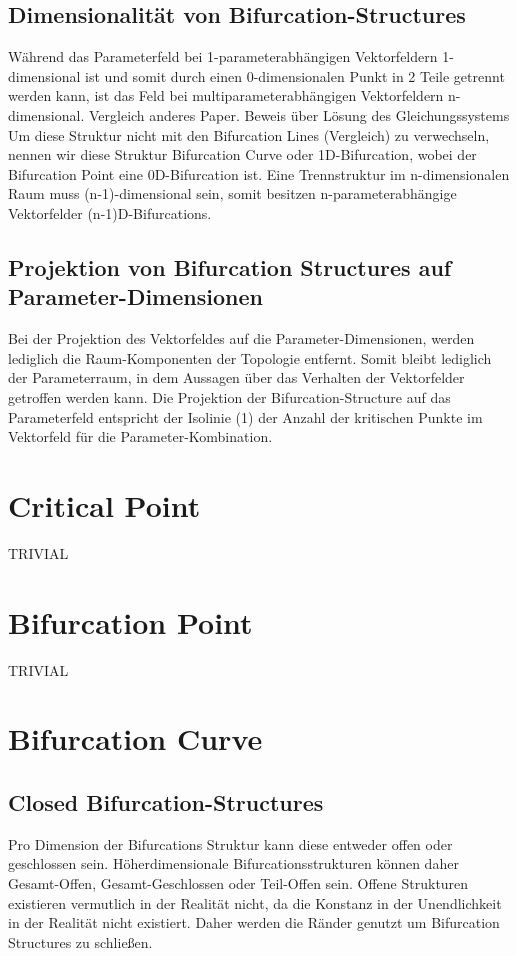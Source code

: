 \documentclass[11pt]{article}
\begin{document}
\subsection{Dimensionalität von Bifurcation-Structures}
Während das Parameterfeld bei 1-parameterabhängigen Vektorfeldern 1-dimensional ist und somit durch einen 0-dimensionalen Punkt in 2 Teile getrennt werden kann, ist das Feld bei multiparameterabhängigen Vektorfeldern n-dimensional.
Vergleich anderes Paper.
Beweis über Lösung des Gleichungssystems
Um diese Struktur nicht mit den Bifurcation Lines (Vergleich) zu verwechseln, nennen wir diese Struktur Bifurcation Curve oder 1D-Bifurcation, wobei der Bifurcation Point eine 0D-Bifurcation ist.
Eine Trennstruktur im n-dimensionalen Raum muss (n-1)-dimensional sein, somit besitzen n-parameterabhängige Vektorfelder (n-1)D-Bifurcations.

\subsection{Projektion von Bifurcation Structures auf Parameter-Dimensionen}
Bei der Projektion des Vektorfeldes auf die Parameter-Dimensionen, werden lediglich die Raum-Komponenten der Topologie entfernt. Somit bleibt lediglich der Parameterraum, in dem Aussagen über das Verhalten der Vektorfelder getroffen werden kann.
Die Projektion der Bifurcation-Structure auf das Parameterfeld entspricht der Isolinie (1) der Anzahl der kritischen Punkte im Vektorfeld für die Parameter-Kombination.
\section{Critical Point}
TRIVIAL
\section{Bifurcation Point}
TRIVIAL
\section{Bifurcation Curve}
\subsection{Closed Bifurcation-Structures}
Pro Dimension der Bifurcations Struktur kann diese entweder offen oder geschlossen sein.
Höherdimensionale Bifurcationsstrukturen können daher Gesamt-Offen, Gesamt-Geschlossen oder Teil-Offen sein.
Offene Strukturen existieren vermutlich in der Realität nicht, da die Konstanz in der Unendlichkeit in der Realität nicht existiert.
Daher werden die Ränder genutzt um Bifurcation Structures zu schließen.
\end{document}

